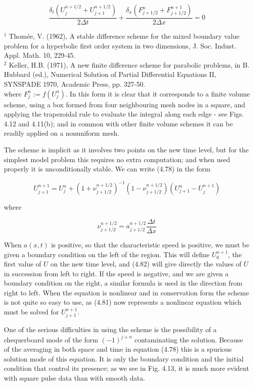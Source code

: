 \documentclass[10pt]{article}
\begin{document}
\[
\frac{\delta_{t}\left(U_{j}^{n+1 / 2}+U_{j+1}^{n+1 / 2}\right)}{2 \Delta t}+\frac{\delta_{x}\left(F_{j+1 / 2}^{n}+F_{j+1 / 2}^{n+1}\right)}{2 \Delta x}=0
\]

\({ }^{1}\) Thomée, V. (1962), A stable difference scheme for the mixed boundary value problem for a hyperbolic first order system in two dimensions, J. Soc. Indust. Appl. Math. 10, 229-45.\\
\({ }^{2}\) Keller, H.B. (1971), A new finite difference scheme for parabolic problems, in B. Hubbard (ed.), Numerical Solution of Partial Differential Equations II, SYNSPADE 1970, Academic Press, pp. 327-50.\\
where \(F_{j}^{n}:=f\left(U_{j}^{n}\right)\). In this form it is clear that it corresponds to a finite volume scheme, using a box formed from four neighbouring mesh nodes in a square, and applying the trapezoidal rule to evaluate the integral along each edge - see Figs. 4.12 and 4.11(b); and in common with other finite volume schemes it can be readily applied on a nonuniform mesh.

The scheme is implicit as it involves two points on the new time level, but for the simplest model problem this requires no extra computation; and when used properly it is unconditionally stable. We can write (4.78) in the form

\[
U_{j+1}^{n+1}=U_{j}^{n}+\left(1+\nu_{j+1 / 2}^{n+1 / 2}\right)^{-1}\left(1-\nu_{j+1 / 2}^{n+1 / 2}\right)\left(U_{j+1}^{n}-U_{j}^{n+1}\right)
\]

where

\[
\nu_{j+1 / 2}^{n+1 / 2}=a_{j+1 / 2}^{n+1 / 2} \frac{\Delta t}{\Delta x}
\]

When \(a(x, t)\) is positive, so that the characteristic speed is positive, we must be given a boundary condition on the left of the region. This will define \(U_{0}^{n+1}\), the first value of \(U\) on the new time level, and (4.82) will give directly the values of \(U\) in succession from left to right. If the speed is negative, and we are given a boundary condition on the right, a similar formula is used in the direction from right to left. When the equation is nonlinear and in conservation form the scheme is not quite so easy to use, as (4.81) now represents a nonlinear equation which must be solved for \(U_{j+1}^{n+1}\).

One of the serious difficulties in using the scheme is the possibility of a chequerboard mode of the form \((-1)^{j+n}\) contaminating the solution. Because of the averaging in both space and time in equation (4.78) this is a spurious solution mode of this equation. It is only the boundary condition and the initial condition that control its presence; as we see in Fig. 4.13, it is much more evident with square pulse data than with smooth data.
\end{document}
